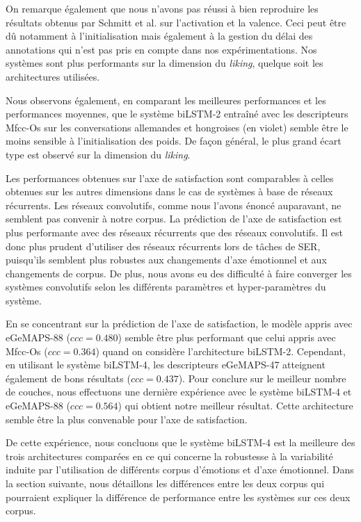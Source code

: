 On remarque également que nous n'avons pas réussi à bien reproduire les résultats obtenus par Schmitt et al. sur l'activation et la valence. Ceci peut être dû notamment à l'initialisation mais également à la gestion du délai des annotations qui n'est pas pris en compte dans nos expérimentations. Nos systèmes sont plus performants sur la dimension du \textit{liking}, quelque soit les architectures utilisées.

Nous observons également, en comparant les meilleures performances et les performances moyennes, que le système biLSTM-2 entraîné avec les descripteurs Mfcc-Os sur les conversations allemandes et hongroises (en violet) semble être le moins sensible à l'initialisation des poids. De façon général, le plus grand écart type est observé sur la dimension du \textit{liking}.

Les performances obtenues sur l'axe de satisfaction sont comparables à celles obtenues sur les autres dimensions dans le cas de systèmes à base de réseaux récurrents. Les réseaux convolutifs, comme nous l'avons énoncé auparavant, ne semblent pas convenir à notre corpus. La prédiction de l'axe de satisfaction est plus performante avec des réseaux récurrents que des réseaux convolutifs. Il est donc plus prudent d'utiliser des réseaux récurrents lors de tâches de SER, puisqu'ils semblent plus robustes aux changements d'axe émotionnel et aux changements de corpus. De plus, nous avons eu des difficulté à faire converger les systèmes convolutifs selon les différents paramètres et hyper-paramètres du système.

En se concentrant sur la prédiction de l'axe de satisfaction, le modèle appris avec eGeMAPS-88 ($ccc=0.480$) semble être plus performant que celui appris avec Mfcc-Os ($ccc=0.364$) quand on considère l'architecture biLSTM-2. Cependant, en utilisant le système biLSTM-4, les descripteurs eGeMAPS-47 atteignent également de bons résultats ($ccc=0.437$). Pour conclure sur le meilleur nombre de couches, nous effectuons une dernière expérience avec le système biLSTM-4 et eGeMAPS-88 ($ccc=0.564$) qui obtient notre meilleur résultat. Cette architecture semble être la plus convenable pour l'axe de satisfaction.

De cette expérience, nous concluons que le système biLSTM-4 est la meilleure des trois architectures comparées en ce qui concerne la robustesse à la variabilité induite par l'utilisation de différents corpus d'émotions et d'axe émotionnel. Dans la section suivante, nous détaillons les différences entre les deux corpus qui pourraient expliquer la différence de performance entre les systèmes sur ces deux corpus.

